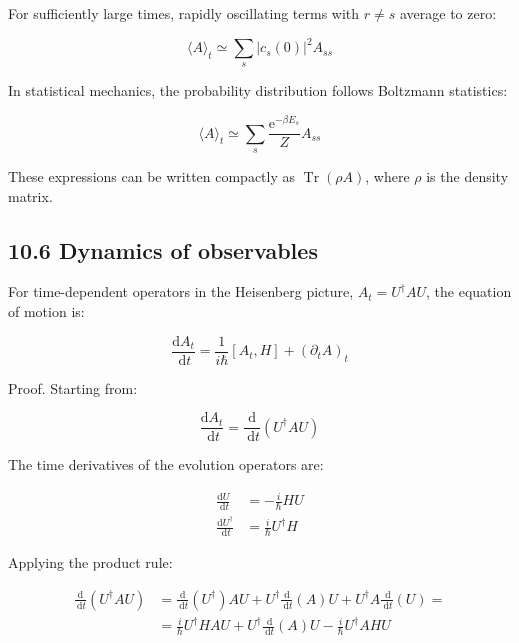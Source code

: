 \documentclass[10pt]{article}
\begin{document}
For sufficiently large times, rapidly oscillating terms with $r \neq s$ average to zero:

\begin{equation*}
\langle A\rangle_{t} \simeq \sum_{s}\left|c_{s}(0)\right|^{2} A_{s s} \tag{10.36}
\end{equation*}

In statistical mechanics, the probability distribution follows Boltzmann statistics:

\begin{equation*}
\langle A\rangle_{t} \simeq \sum_{s} \frac{\mathrm{e}^{-\beta E_{s}}}{Z} A_{s s} \tag{10.37}
\end{equation*}

These expressions can be written compactly as $\operatorname{Tr}(\rho A)$, where $\rho$ is the density matrix.

\subsection*{10.6 Dynamics of observables}
For time-dependent operators in the Heisenberg picture, $A_t = U^\dagger A U$, the equation of motion is:

\begin{equation*}
\frac{\mathrm{d} A_{t}}{\mathrm{~d} t}=\frac{1}{i \hbar}\left[A_{t}, H\right]+\left(\partial_{t} A\right)_{t} \tag{10.38}
\end{equation*}


Proof. Starting from:

\begin{equation*}
\frac{\mathrm{d} A_{t}}{\mathrm{~d} t}=\frac{\mathrm{d}}{\mathrm{~d} t}\left(U^{\dagger} A U\right) \tag{10.39}
\end{equation*}

The time derivatives of the evolution operators are:

\begin{align*}
\frac{\mathrm{d} U}{\mathrm{~d} t} & =-\frac{i}{\hbar} H U \\
\frac{\mathrm{d} U^{\dagger}}{\mathrm{~d} t} & =\frac{i}{\hbar} U^{\dagger} H \tag{10.40}
\end{align*}

Applying the product rule:

\begin{align*}
\frac{\mathrm{d}}{\mathrm{~d} t}\left(U^{\dagger} A U\right) & =\frac{\mathrm{d}}{\mathrm{~d} t}\left(U^{\dagger}\right) A U+U^{\dagger} \frac{\mathrm{d}}{\mathrm{~d} t}(A) U+U^{\dagger} A \frac{\mathrm{~d}}{\mathrm{~d} t}(U)=  \tag{10.41}\\
& =\frac{i}{\hbar} U^{\dagger} H A U+U^{\dagger} \frac{\mathrm{~d}}{\mathrm{~d} t}(A) U-\frac{i}{\hbar} U^{\dagger} A H U
\end{align*}
\end{document}
